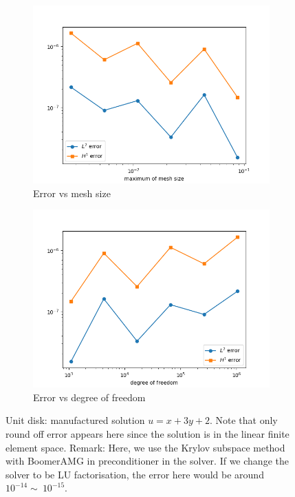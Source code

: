 \documentclass[12pt]{article}%
\theoremstyle{plain}
\numberwithin{equation}{section}
\begin{document}
\begin{figure}[H]%
    \centering
         \begin{subfigure}[h]{0.45\linewidth}
          \caption{Error vs mesh size}
\includegraphics[width=\linewidth]{figures/Ex3/disk_test1.png}
\end{subfigure}
  \begin{subfigure}[h]{0.45\linewidth}
   \caption{Error vs degree of freedom}
\includegraphics[width=\linewidth]{figures/Ex3/disk_test1_dof.png}
\end{subfigure}
  \caption{Unit disk: manufactured solution $u=x+3y+2$. Note that only round off error appears here since the solution is in the linear finite element space.  Remark: Here, we use the Krylov subspace method with BoomerAMG in preconditioner in the solver. If we change the solver to be LU factorisation, the error here would be around $10^{-14}\sim~10^{-15}$.}
  \label{fig:Ex3_disk_test}
 \end{figure}
\end{document}
